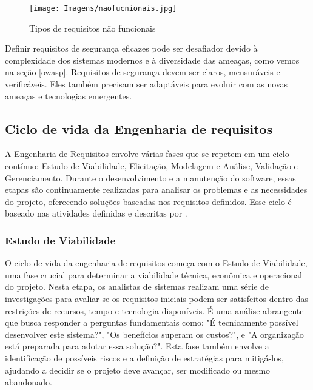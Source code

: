     \begin{figure}[H]
    \centering 
    \texttt{[image: Imagens/naofucnionais.jpg]}
    \caption{Tipos de requisitos não funcionais}
    \cite{sommerville2011}
    \label{naofunc}
    \end{figure}
    
    Definir requisitos de segurança eficazes pode ser desafiador devido à complexidade dos sistemas modernos e à diversidade das ameaças, como vemos na seção  \ref{owasp}. Requisitos de segurança devem ser claros, mensuráveis e verificáveis. Eles também precisam ser adaptáveis para evoluir com as novas ameaças e tecnologias emergentes.
    
    
    \subsection{Ciclo de vida da Engenharia de requisitos}
    
    A Engenharia de Requisitos envolve várias fases que se repetem em um ciclo contínuo: Estudo de Viabilidade, Elicitação, Modelagem e Análise, Validação e Gerenciamento. Durante o desenvolvimento e a manutenção do software, essas etapas são continuamente realizadas para analisar os problemas e as necessidades do projeto, oferecendo soluções baseadas nos requisitos definidos. Esse ciclo é baseado nas atividades definidas e descritas por .
    
    \subsubsection{Estudo de Viabilidade}
    O ciclo de vida da engenharia de requisitos começa com o Estudo de Viabilidade, uma fase crucial para determinar a viabilidade técnica, econômica e operacional do projeto. Nesta etapa, os analistas de sistemas realizam uma série de investigações para avaliar se os requisitos iniciais podem ser satisfeitos dentro das restrições de recursos, tempo e tecnologia disponíveis. É uma análise abrangente que busca responder a perguntas fundamentais como: "É tecnicamente possível desenvolver este sistema?", "Os benefícios superam os custos?", e "A organização está preparada para adotar essa solução?". Esta fase também envolve a identificação de possíveis riscos e a definição de estratégias para mitigá-los, ajudando a decidir se o projeto deve avançar, ser modificado ou mesmo abandonado.
    
